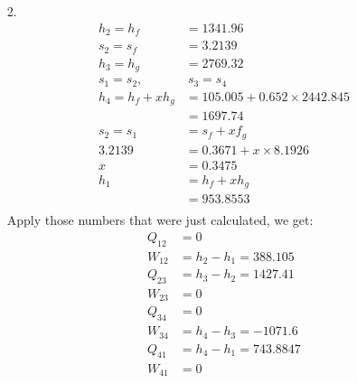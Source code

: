 \documentclass{article}
\begin{document}
\begin{itemize}
\begin{itemize}
\begin{figure}[h]
        \end{figure}
    \end{itemize}
    \newpage
    \item [2.]
    \begin{align*}
        h_2=h_f&=1341.96\\
        s_2=s_f&=3.2139\\
        h_3=h_g&=2769.32\\
        s_1=s_2,&\ s_3=s_4\\
        h_4=h_f+xh_g&=105.005+0.652\times 2442.845\\
        &=1697.74\\
        s_2 = s_1 &= s_f+xf_g\\
        3.2139&=0.3671+x\times 8.1926\\
        x&=0.3475\\
        h_1 &= h_f+xh_g\\
        &=953.8553\\
    \end{align*}
    Apply those numbers that were just calculated, we get:
    \begin{align*}
        Q_{12}&=0\\
        W_{12}&=h_2-h_1=388.105\\
        Q_{23}&=h_3-h_2=1427.41\\
        W_{23}&=0\\
        Q_{34}&=0\\
        W_{34}&=h_4-h_3=-1071.6\\
        Q_{41}&=h_4-h_1=743.8847\\
        W_{41}&=0
    \end{align*}
\end{itemize}
\end{document}
